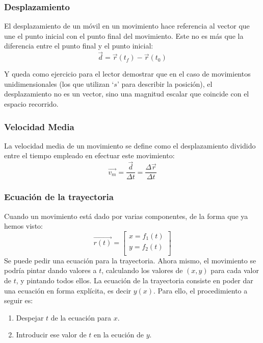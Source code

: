 \documentclass[ %
    oneside,    %
    10pt        %
]{apuntes} %
\begin{document}
\subsubsection{Desplazamiento}
El desplazamiento de un móvil en un movimiento hace referencia al vector que une el punto inicial con el punto final del movimiento. Este no es más que la diferencia entre el punto final y el punto inicial:
\[\vec{d} = \vec{r}(t_f) - \vec{r}(t_0)\]

Y queda como ejercicio para el lector demostrar que en el caso de movimientos unidimensionales (los que utilizan `$s$' para describir la posición), el desplazamiento no es un vector, sino una magnitud escalar que coincide con el espacio recorrido.

\subsubsection{Velocidad Media}
La velocidad media de un movimiento se define como el desplazamiento dividido entre el tiempo empleado en efectuar este movimiento:
\[\vec{v_m} = \frac{\vec{d}}{\Delta t} = \frac{\Delta \vec{r}}{\Delta t}\]

\subsubsection{Ecuación de la trayectoria}
Cuando un movimiento está dado por varias componentes, de la forma que ya hemos visto:
\[\vec{r(t)} = \left[\begin{array}{c}
			x = f_1(t) \\
			y = f_2(t) \\
		\end{array}\right]\]
Se puede pedir una ecuación para la trayectoria. Ahora mismo, el movimiento se podría pintar dando valores a $t$, calculando los valores de $(x, y)$ para cada valor de $t$, y pintando todos ellos. La ecuación de la trayectoria consiste en poder dar una ecuación en forma explícita, es decir $y(x)$. Para ello, el procedimiento a seguir es:
\begin{enumerate}
	\item Despejar $t$ de la ecuación para $x$.
	\item Introducir ese valor de $t$ en la ecución de $y$.
\end{enumerate}
\end{document}
